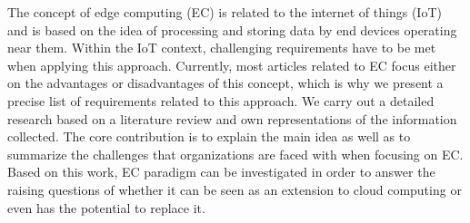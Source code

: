 The concept of edge computing (EC) is related to the internet of things (IoT) and is based on the idea of processing and storing data by end devices operating near them. Within the IoT context, challenging requirements have to be met when applying this approach. Currently, most articles related to EC focus either on the advantages or disadvantages of this concept, which is why we present a precise list of requirements related to this approach. We carry out a detailed research based on a literature review and own representations of the information collected. The core contribution is to explain the main idea as well as to summarize the challenges that organizations are faced with when focusing on EC. Based on this work, EC paradigm can be investigated in order to answer the raising questions of whether it can be seen as an extension to cloud computing or even has the potential to replace it.